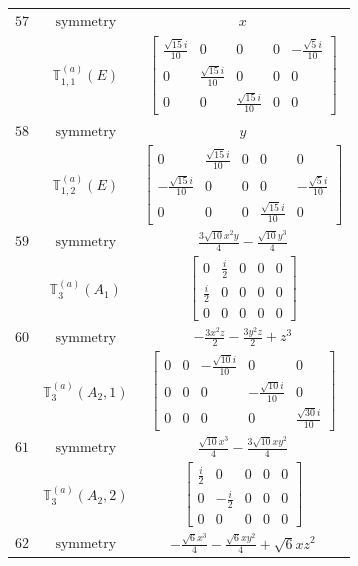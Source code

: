 \documentclass[fleqn,8pt,landscape]{jsarticle}
\begin{document}
\begin{longtable}{ccc}
$ 57 $ & $ \text{symmetry} $ & $ x $ \\
$  $ & $ \mathbb{T}_{1,1}^{(a)}(E) $ & $ \begin{bmatrix} \frac{\sqrt{15} i}{10} & 0 & 0 & 0 & - \frac{\sqrt{5} i}{10} \\ 0 & \frac{\sqrt{15} i}{10} & 0 & 0 & 0 \\ 0 & 0 & \frac{\sqrt{15} i}{10} & 0 & 0 \end{bmatrix} $ \\ \hline
$ 58 $ & $ \text{symmetry} $ & $ y $ \\
$  $ & $ \mathbb{T}_{1,2}^{(a)}(E) $ & $ \begin{bmatrix} 0 & \frac{\sqrt{15} i}{10} & 0 & 0 & 0 \\ - \frac{\sqrt{15} i}{10} & 0 & 0 & 0 & - \frac{\sqrt{5} i}{10} \\ 0 & 0 & 0 & \frac{\sqrt{15} i}{10} & 0 \end{bmatrix} $ \\ \hline
$ 59 $ & $ \text{symmetry} $ & $ \frac{3 \sqrt{10} x^{2} y}{4} - \frac{\sqrt{10} y^{3}}{4} $ \\
$  $ & $ \mathbb{T}_{3}^{(a)}(A_{1}) $ & $ \begin{bmatrix} 0 & \frac{i}{2} & 0 & 0 & 0 \\ \frac{i}{2} & 0 & 0 & 0 & 0 \\ 0 & 0 & 0 & 0 & 0 \end{bmatrix} $ \\ \hline
$ 60 $ & $ \text{symmetry} $ & $ - \frac{3 x^{2} z}{2} - \frac{3 y^{2} z}{2} + z^{3} $ \\
$  $ & $ \mathbb{T}_{3}^{(a)}(A_{2},1) $ & $ \begin{bmatrix} 0 & 0 & - \frac{\sqrt{10} i}{10} & 0 & 0 \\ 0 & 0 & 0 & - \frac{\sqrt{10} i}{10} & 0 \\ 0 & 0 & 0 & 0 & \frac{\sqrt{30} i}{10} \end{bmatrix} $ \\ \hline
$ 61 $ & $ \text{symmetry} $ & $ \frac{\sqrt{10} x^{3}}{4} - \frac{3 \sqrt{10} x y^{2}}{4} $ \\
$  $ & $ \mathbb{T}_{3}^{(a)}(A_{2},2) $ & $ \begin{bmatrix} \frac{i}{2} & 0 & 0 & 0 & 0 \\ 0 & - \frac{i}{2} & 0 & 0 & 0 \\ 0 & 0 & 0 & 0 & 0 \end{bmatrix} $ \\ \hline
$ 62 $ & $ \text{symmetry} $ & $ - \frac{\sqrt{6} x^{3}}{4} - \frac{\sqrt{6} x y^{2}}{4} + \sqrt{6} x z^{2} $ \\

\end{longtable}
\end{document}
